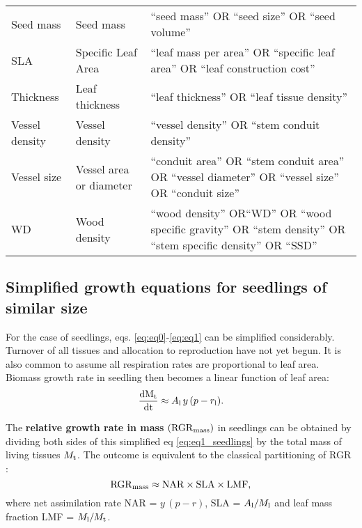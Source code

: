 \documentclass[a4paper,11pt]{article}
\newcommand{\ud}{\ensuremath{\rm{d}}}
\begin{document}
\begin{appendices}
\begin{table}[h!]
{\begin{tabular}{p{3cm}p{3cm}p{8cm}}
  Seed mass & Seed mass & ``seed mass'' OR ``seed size'' OR ``seed volume'' \\
  SLA & Specific Leaf Area & ``leaf mass per area'' OR ``specific leaf area'' OR ``leaf construction cost'' \\
  Thickness & Leaf thickness & ``leaf thickness''  OR ``leaf tissue density'' \\
  Vessel density & Vessel density & ``vessel density'' OR ``stem conduit density'' \\
  Vessel size & Vessel area or diameter & ``conduit area'' OR ``stem conduit area'' OR ``vessel diameter'' OR ``vessel size'' OR ``conduit size''   \\
  WD & Wood density & ``wood density'' OR``WD'' OR ``wood specific gravity'' OR ``stem density'' OR ``stem specific density'' OR ``SSD'' \\
   \hline
\end{tabular}
}
\end{table}

\clearpage

\subsection{Simplified growth equations for seedlings of similar size}

For the case of seedlings, eqs. \ref{eq:eq0}-\ref{eq:eq1} can be simplified considerably. Turnover of all tissues and allocation to reproduction have not yet begun. It is also common to assume all respiration rates are proportional to leaf area. Biomass growth rate in seedling then becomes a linear function of leaf area:
\begin{equation}\label{eq:eq1_seedlings}
{\frac{\ud M_{\rm t}}{\ud t}}  \approx  A_{\rm l} \, y \, (p - r_{\rm l}).
\end{equation}

The \textbf{relative growth rate in mass} $({\rm RGR}_{{\rm mass}})$ in seedlings can be obtained by dividing both sides of this simplified eq \ref{eq:eq1_seedlings} by the total mass of living tissues $M_{\rm t}$. The outcome is equivalent to the classical partitioning of RGR \citep{Lambers:1992bj, Cornelissen:1998ta}:
\begin{equation}\label{eq:eq1_seedlings_RGR}
{\rm RGR}_{{\rm mass}}  \approx {\rm NAR} \times  {\rm SLA} \times  {\rm LMF},
\end{equation}
where net assimilation rate NAR = $y \, (p - r)$, SLA = $A_{\rm l}/ M_{\rm l}$ and leaf mass fraction LMF = $M_{\rm l}/ M_{\rm t}$.


\end{appendices}
\end{document}
